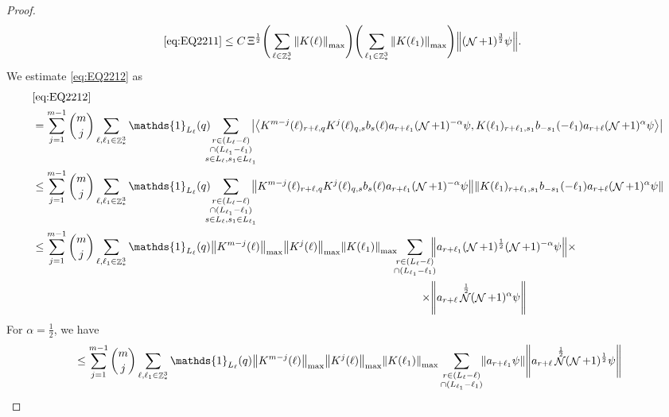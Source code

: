 \documentclass[sn-mathphys, Numbered ,a4paper]{sn-jnl}%
\DeclareMathOperator{\Z}{\mathbb{Z}}
\DeclareMathOperator{\NN}{\mathcal{N}}
\newcommand{\half}{\frac{1}{2}}
\newcommand{\eva}[1]{\left\langle #1 \right\rangle}
\theoremstyle{plain}
\theoremstyle{definition}
\theoremstyle{remark}
\theoremstyle{plain}
\theoremstyle{definition}
\theoremstyle{remark}
\begin{document}
\begin{proof}
\begin{align}
 	\eqref{eq:EQ2211}&\leq C \,\Xi^{\half} \Bigg(\sum\limits_{\ell \in \Z^3_*} \norm{K(\ell)}_{\mathrm{max}}\Bigg)\Bigg( \sum\limits_{\ell_1 \in \Z^3_*}\norm{K(\ell_1)}_{\mathrm{max}} \Bigg)  \norm { (\NN+1)^{\frac{3}{2}} \psi }. \label{eq:estEQ2211}
 \end{align}
 We estimate \eqref{eq:EQ2212} as 
 \begin{alignat}{2}
 	&\eqref{eq:EQ2212}\nonumber\\
 	&= \sum\limits_{j=1}^{m-1} {{m}\choose j} \sum\limits_{\ell, \ell_1\in \Z^3_*} \mathds{1}_{L_{\ell}}(q)\!\!\!\! \sum\limits_{\substack{r\in (L_{\ell}-\ell)\\ \cap (L_{\ell_1}-\ell_1)\\ s \in L_{\ell},s_1\in L_{\ell_1}}}\!\!\!\! \abs{ \eva{ K^{m-j}(\ell)_{r+\ell,q} K^{j}(\ell)_{q,s} b_{s}(\ell) a_{r+\ell_1}(\NN+1)^{-\alpha} \psi, K(\ell_1)_{r+\ell_1,s_1} b_{-s_1}(-\ell_1) a_{r+\ell}(\NN+1)^{\alpha} \psi }}\nonumber\\
 	&\leq \sum\limits_{j=1}^{m-1} {{m}\choose j} \sum\limits_{\ell, \ell_1\in \Z^3_*} \mathds{1}_{L_{\ell}}(q)\!\!\!\! \sum\limits_{\substack{r\in (L_{\ell}-\ell)\\ \cap (L_{\ell_1}-\ell_1)\\ s \in L_{\ell},s_1\in L_{\ell_1}}}\!\!\!\! \norm{ K^{m-j}(\ell)_{r+\ell,q} K^{j}(\ell)_{q,s} b_{s}(\ell) a_{r+\ell_1}(\NN+1)^{-\alpha} \psi}\norm{ K(\ell_1)_{r+\ell_1,s_1} b_{-s_1}(-\ell_1)   a_{r+\ell}(\NN+1)^{\alpha} \psi }\nonumber\\
 	&\leq \sum\limits_{j=1}^{m-1} {{m}\choose j} \sum\limits_{\ell, \ell_1\in \Z^3_*} \mathds{1}_{L_{\ell}}(q) \norm{K^{m-j}(\ell)}_{\mathrm{max}} \norm{ K^{j}(\ell)}_{\mathrm{max}} \norm{ K(\ell_1) }_{\mathrm{max}}\!\!\!\begin{aligned}[t] \sum\limits_{\substack{r\in (L_{\ell}-\ell)\\ \cap (L_{\ell_1}-\ell_1)}}\!\!\! &\norm{ a_{r+\ell_1} (\NN+1)^\half (\NN+1)^{-\alpha} \psi}\times\\\times &\norm{a_{r+\ell} \NN^\half (\NN+1)^{\alpha}\psi }\end{aligned}\nonumber
 \end{alignat} 
 For $\alpha = \half$, we have
 \begin{align}
 	&\leq \sum\limits_{j=1}^{m-1} {{m}\choose j} \sum\limits_{\ell, \ell_1\in \Z^3_*} \mathds{1}_{L_{\ell}}(q)\norm{K^{m-j}(\ell)}_{\mathrm{max}} \norm{ K^{j}(\ell)}_{\mathrm{max}} \norm{ K(\ell_1) }_{\mathrm{max}} \sum\limits_{\substack{r\in (L_{\ell}-\ell) \\ \cap (L_{\ell_1}-\ell_1)}}\!\! \norm{ a_{r+\ell_1} \psi} \norm{ a_{r+\ell}\NN^\half (\NN+1)^\half \psi }\nonumber\\

\end{align}
\end{proof}
\end{document}
